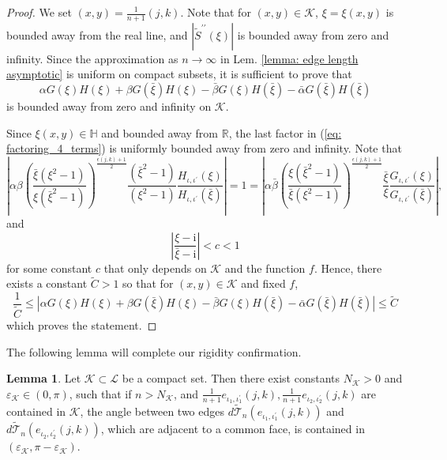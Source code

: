 \documentclass[12pt]{amsart}
\newcommand{\tS}{{\widetilde S}}
\newcommand{\al}{{\alpha}}
\numberwithin{equation}{section}
\theoremstyle{definition}
\newtheorem{lemma}[thm]{Lemma}
\begin{document}
\begin{proof}
    We set $(x, y)=\frac{1}{n+1}(j, k)$. Note that for $(x, y) \in \mathcal{K}$, $\xi=\xi(x, y)$ is bounded away from the real line, and $\left|\tS^{\prime \prime}(\xi)\right|$ is bounded away from zero and infinity. Since the approximation as $n \to \infty$ in Lem. \ref{lemma: edge length asymptotic} is uniform on compact subsets, it is sufficient to prove that
$$
\al G(\xi)H(\xi)+\beta G(\bar \xi)H(\xi)-\bar\beta G(\xi)H(\bar \xi)-\bar \al G(\bar \xi)H(\bar \xi)
$$
is bounded away from zero and infinity on $\mathcal{K}$.

Since $\xi(x, y)\in \mathbb H$ and bounded away from $\mathbb{R}$, the last factor in (\ref{eq: factoring_4_terms}) is uniformly bounded away from zero and infinity. Note that
$$
\left|\alpha \beta \left(\frac{\bar \xi (\xi^2-1)}{\xi(\bar \xi^2-1)}\right)^{\frac{\epsilon(j,k) +1}{2}}\frac{(\bar{\xi}^2-1)}{(\xi^2-1)} \frac{H_{\iota, \iota^{\prime}}(\xi)}{H_{\iota, \iota^{\prime}}(\bar{\xi})}\right|=1=\left|\alpha \bar{\beta} \left(\frac{ \xi (\bar\xi^2-1)}{\bar\xi(\xi^2-1)}\right)^{\frac{\epsilon(j,k) +1}{2}}\frac{\bar{\xi}}{\xi} \frac{G_{\iota, \iota^{\prime}}(\xi)}{G_{\iota, \iota^{\prime}}(\bar{\xi})}\right|,
$$
and
$$
\left|\frac{\xi-\mathrm{i}}{\bar{\xi}-\mathrm{i}}\right|<c<1
$$
for some constant $c$ that only depends on $\mathcal{K}$ and the function $f$. Hence, there exists a constant $\widetilde{C}>1$ so that for $(x, y) \in \mathcal{K}$ and fixed $f$,
$$
\frac{1}{\widetilde{C}} \leq|\al G(\xi)H(\xi)+\beta G(\bar \xi)H(\xi)-\bar\beta G(\xi)H(\bar \xi)-\bar \al G(\bar \xi)H(\bar \xi)| \leq \widetilde{C}
$$
which proves the statement.
\end{proof}
The following lemma will complete our rigidity confirmation.
\begin{lemma}
    \label{lemma: angle_bound}
    Let $\mathcal{K} \subset \mathcal{L}$ be a compact set. Then there exist constants $N_{\mathcal{K}}>0$ and $\varepsilon_{\mathcal{K}} \in(0, \pi)$, such that if $n>N_{\mathcal{K}}$, and $\frac{1}{n+1} e_{\iota_1, \iota_1^{\prime}}(j, k), \frac{1}{n+1} e_{\iota_2, \iota_2^{\prime}}(j, k)$ are contained in $\mathcal{K}$, the angle between two edges $d \widetilde{\mathcal{T}}_n\left(e_{\iota_1, \iota_1^{\prime}}(j, k)\right)$ and $d \widetilde{\mathcal{T}}_n\left(e_{\iota_2, \iota_2^{\prime}}(j, k)\right)$, which are adjacent to a common face, is contained in $\left(\varepsilon_{\mathcal{K}}, \pi-\varepsilon_{\mathcal{K}}\right)$.
\end{lemma}
\end{document}
